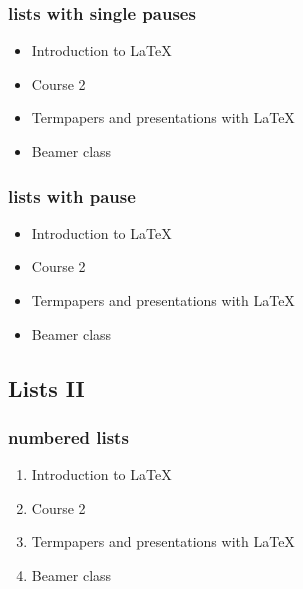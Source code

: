 \documentclass[hyperref={pdfpagelabels=false}]{beamer}
\begin{document}
\begin{frame}
\begin{columns}[T]
{\begin{figure}
    \centering
\end{figure}}
\end{columns}
\end{frame}

\begin{frame}\frametitle{lists with single pauses}
\begin{itemize}
\item Introduction to  \LaTeX{}  \pause 
\item Course 2 \pause 
\item Termpapers and presentations with \LaTeX{}  \pause 
\item Beamer class
\end{itemize} 
\end{frame}

\begin{frame}\frametitle{lists with pause}
\begin{itemize}[<+->]
\item Introduction to  \LaTeX{}  
\item Course 2
\item Termpapers and presentations with \LaTeX{}  
\item Beamer class
\end{itemize} 
\end{frame}

\subsection{Lists II}
\begin{frame}\frametitle{numbered lists}
\begin{enumerate}
\item Introduction to  \LaTeX{}   
\item Course 2 
\item Termpapers and presentations with \LaTeX{}  
\item Beamer class
\end{enumerate}
\end{frame}
\end{document}
